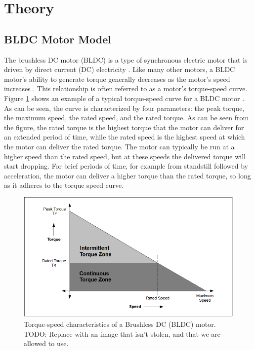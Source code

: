 \section{Theory}

\subsection{BLDC Motor Model}
    \label{sec:bldc_theory}

    The brushless DC motor (BLDC) is a type of synchronous electric motor that is driven by direct current (DC) electricity \cite{PMSM_BOOK}. Like many other motors, a BLDC motor's ability to generate torque generally decreases as the motor's speed increases \cite{Microchip_BLDC}. This relationship is often referred to as a motor's torque-speed curve. Figure \ref{fig:bldc_torque_speed} shows an example of a typical torque-speed curve for a BLDC motor \cite{Microchip_BLDC}. As can be seen, the curve is characterized by four parameters: the peak torque, the maximum speed, the rated speed, and the rated torque. As can be seen from the figure, the rated torque is the highest torque that the motor can deliver for an extended period of time, while the rated speed is the highest speed at which the motor can deliver the rated torque. The motor can typically be run at a higher speed than the rated speed, but at these speeds the delivered torque will start dropping. For brief periods of time, for example from standstill followed by acceleration, the motor can deliver a higher torque than the rated torque, so long as it adheres to the torque speed curve. 

    \begin{figure}[H]
        \centering
        \includegraphics[width=\textwidth]{Images/stolen_BLDC_torque_speed.png}
        \caption{Torque-speed characteristics of a Brushless DC (BLDC) motor. TODO: Replace with an image that isn't stolen, and that we are allowed to use. }
        \label{fig:bldc_torque_speed}
    \end{figure}

